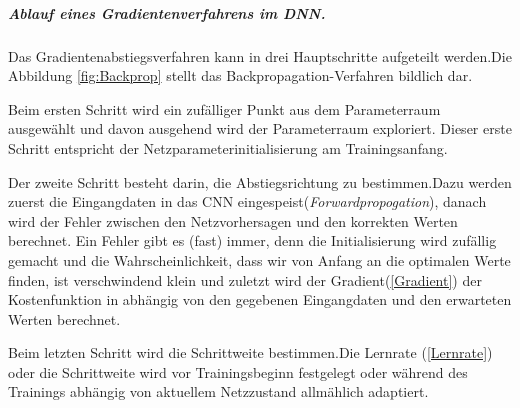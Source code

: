 \documentclass[12pt,a4paper]{scrartcl}
\numberwithin{equation}{section}
\begin{document}
\subparagraph{Ablauf eines Gradientenverfahrens im \ac{DNN}.}

Das Gradientenabstiegsverfahren kann in drei Hauptschritte aufgeteilt werden.Die Abbildung \ref{fig:Backprop} stellt das Backpropagation-Verfahren bildlich dar.

Beim ersten Schritt  wird ein zufälliger Punkt aus dem Parameterraum ausgewählt und davon ausgehend wird der Parameterraum exploriert. Dieser erste Schritt entspricht der Netzparameterinitialisierung am Trainingsanfang.

Der zweite Schritt besteht darin, die Abstiegsrichtung zu bestimmen.Dazu werden zuerst die Eingangdaten in das \ac{CNN} eingespeist(\textit{Forwardpropogation}), danach wird der Fehler zwischen den Netzvorhersagen und den korrekten Werten berechnet. Ein Fehler gibt es (fast) immer, denn die Initialisierung wird zufällig gemacht und die Wahrscheinlichkeit, dass wir von Anfang an die optimalen Werte finden, ist verschwindend klein und zuletzt wird der Gradient(\ref{Gradient}) der Kostenfunktion in abhängig von den gegebenen Eingangdaten und den erwarteten Werten berechnet. 

Beim letzten Schritt wird die Schrittweite bestimmen.Die Lernrate (\ref{Lernrate}) oder die Schrittweite wird vor Trainingsbeginn festgelegt oder während des Trainings abhängig von aktuellem Netzzustand allmählich adaptiert.
\end{document}

